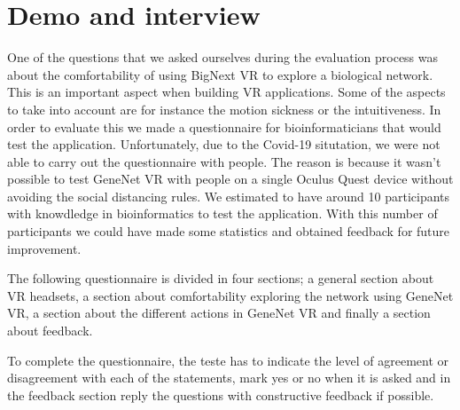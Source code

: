 \section{Demo and interview}
One of the questions that we asked ourselves during the evaluation process was about the comfortability of using BigNext VR to explore a biological network. This is an important aspect when building VR applications. Some of the aspects to take into account are for instance the motion sickness or the intuitiveness. In order to evaluate this we made a questionnaire for bioinformaticians that would test the application. Unfortunately, due to the Covid-19 situtation\cite{covid_19}, we were not able to carry out the questionnaire with people. The reason is because it wasn't possible to test GeneNet VR with people on a single Oculus Quest device without avoiding the social distancing rules.
We estimated to have around 10 participants with knowdledge in bioinformatics to test the application. With this number of participants we could have made some statistics and obtained feedback for future improvement.

The following questionnaire is divided in four sections; a general section about VR headsets, a section about comfortability exploring the network using GeneNet VR, a section about the different actions in GeneNet VR and finally a section about feedback.

To complete the questionnaire, the teste has to indicate the level of agreement or disagreement with each of the  statements, mark yes or no when it is asked and in the feedback section reply the questions with constructive feedback if possible.\\


